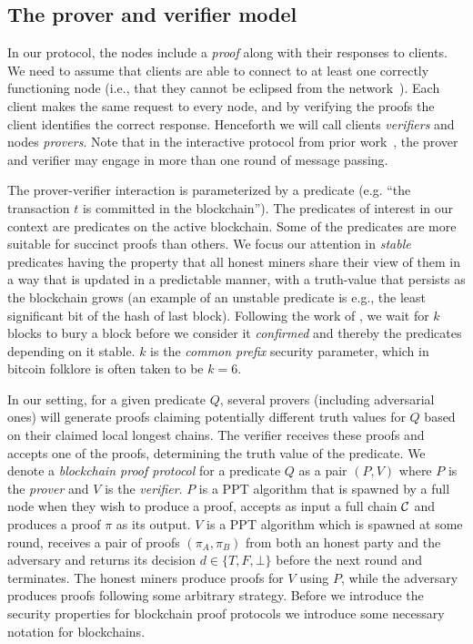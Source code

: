 \subsection{The prover and verifier model}
In our protocol, the nodes include a \emph{proof} along with their responses to clients.
We need to assume that clients are able to connect to at least one correctly functioning node (i.e., that they cannot be eclipsed from the network~\cite{heilman2015eclipse,hijackingbitcoin}).
Each client makes the same request to every node, and by verifying the proofs the client identifies the correct response.
Henceforth we will call clients \textit{verifiers} and nodes \textit{provers}.
Note that in the interactive protocol from prior work~\cite{KLS},  the prover and verifier may engage in more than one round of message passing.

The prover-verifier interaction is parameterized by a predicate (e.g. ``the transaction $t$ is committed in the blockchain'').
%
The predicates of interest in our context are predicates on the active
blockchain. Some of the predicates are more suitable for succinct proofs than
others. We focus our attention in \textit{stable} predicates having the property
that all honest miners share their view of them in a way that is updated in a
predictable manner, with a truth-value that persists as the blockchain grows (an
example of an unstable predicate is e.g., the least significant bit of the hash
of last block). Following the work of \cite{backbone}, we wait for $k$ blocks to
bury a block before we consider it \textit{confirmed} and thereby the predicates
depending on it stable. $k$ is the \textit{common prefix} security parameter,
which in bitcoin folklore is often taken to be $k = 6$.

In our setting, for a given predicate $Q$, several  provers (including
adversarial ones) will generate proofs claiming potentially different truth
values for $Q$ based on their claimed local longest chains. The verifier
receives these proofs and accepts one of the proofs, determining the truth value
of the predicate.  We denote a  \textit{blockchain proof protocol} for a
predicate $Q$ as a pair $(P, V)$ where $P$ is the \textit{prover} and $V$ is the
\textit{verifier}. $P$ is a PPT algorithm that is spawned by a full node when
they wish to produce a proof, accepts as input a full chain $\mathcal{C}$ and
produces a proof $\pi$ as its output. $V$ is a PPT algorithm which is spawned at
some round, receives a pair of proofs $(\pi_A, \pi_B)$ from both an honest party
and the adversary and returns its decision $d \in \{T, F, \bot\}$ before the
next round and terminates. The honest miners produce proofs for $V$ using $P$,
while the adversary produces proofs following some arbitrary strategy. Before we
introduce the security properties for blockchain proof protocols we introduce
some necessary notation for blockchains.

